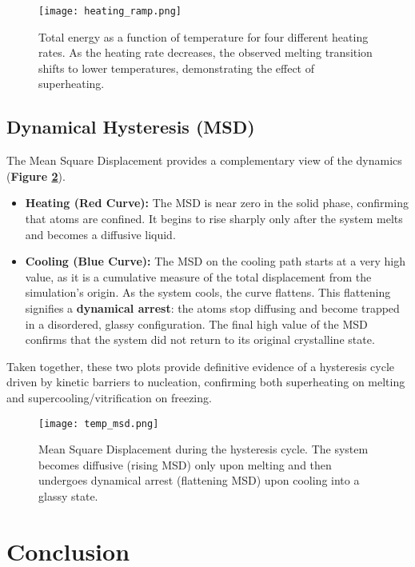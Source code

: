 \documentclass{article}
\begin{document}
\begin{figure}[htbp]
    \centering
    \texttt{[image: heating\_ramp.png]}
    \caption{Total energy as a function of temperature for four different heating rates. As the heating rate decreases, the observed melting transition shifts to lower temperatures, demonstrating the effect of superheating.}
    \label{fig:heating_rates}
\end{figure}

\subsection{Dynamical Hysteresis (MSD)}

The Mean Square Displacement provides a complementary view of the dynamics (\textbf{Figure \ref{fig:hyst_msd}}).
\begin{itemize}
    \item \textbf{Heating (Red Curve):} The MSD is near zero in the solid phase, confirming that atoms are confined. It begins to rise sharply only after the system melts and becomes a diffusive liquid.
    \item \textbf{Cooling (Blue Curve):} The MSD on the cooling path starts at a very high value, as it is a cumulative measure of the total displacement from the simulation's origin. As the system cools, the curve flattens. This flattening signifies a \textbf{dynamical arrest}: the atoms stop diffusing and become trapped in a disordered, glassy configuration. The final high value of the MSD confirms that the system did not return to its original crystalline state.
\end{itemize}

Taken together, these two plots provide definitive evidence of a hysteresis cycle driven by kinetic barriers to nucleation, confirming both superheating on melting and supercooling/vitrification on freezing.

\begin{figure}[h!]
    \centering
    \texttt{[image: temp\_msd.png]}
    \caption{Mean Square Displacement during the hysteresis cycle. The system becomes diffusive (rising MSD) only upon melting and then undergoes dynamical arrest (flattening MSD) upon cooling into a glassy state.}
    \label{fig:hyst_msd}
\end{figure}


\section{Conclusion}
\end{document}
